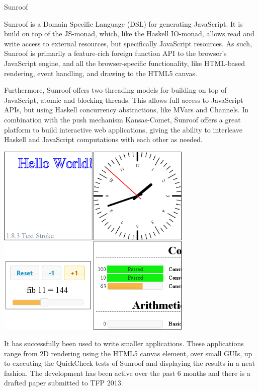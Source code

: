 \begin{hcarentry}[updated]{Sunroof}
\label{sunroof}
\makeheader

Sunroof is a Domain Specific Language (DSL) for generating JavaScript.
It is build on top of the JS-monad, which, like the Haskell IO-monad, allows 
read and write access to external resources, but specifically JavaScript
resources. As such, Sunroof is primarily a feature-rich foreign
function API to the browser's JavaScript engine, and all the browser-specific
functionality, like HTML-based rendering, event handling, and 
drawing to the HTML5 canvas. 

Furthermore, Sunroof offers two threading models for 
building on top of JavaScript, atomic and blocking threads.
This allows full access to JavaScript APIs, but
using Haskell concurrency abstractions, like MVars and Channels.
In combination with the push mechanism Kansas-Comet,
Sunroof offers a great platform to build interactive web applications,
giving the ability to interleave Haskell and JavaScript computations
with each other as needed.

\begin{center}
\includegraphics[width=0.7\textwidth]{html/Sunroof-Examples.png}
\end{center}

It has successfully been used to write smaller applications. These
applications range from 2D rendering using the HTML5 canvas element,
over small GUIs, up to executing the QuickCheck tests of Sunroof 
and displaying the results in a neat fashion.
%
The development has been active over the past 6 months and there is
a drafted paper submitted to TFP 2013.


\end{hcarentry}
